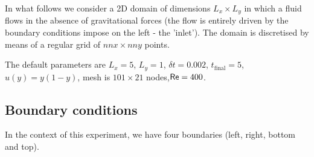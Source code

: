 In what follows we consider a 2D domain of dimensions $L_x \times L_y$ in which 
a fluid flows in the absence of gravitational forces (the flow is entirely driven by 
the boundary conditions impose on the left - the 'inlet'). The domain is discretised by means of a regular grid 
of $nnx \times nny$ points. 

The default parameters are $L_x=5$, $L_y=1$, $\delta t=0.002$, $t_{\text{final}}=5$,
$u(y)=y(1-y)$, mesh is $101\times 21$ nodes,${\mathsf{Re}}=400$.


\subsection*{Boundary conditions}


In the context of this experiment, we have four boundaries (left, right, bottom and top). 
